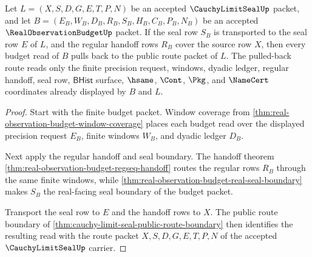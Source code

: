 \begin{theorem}
\label{thm:cauchy-limit-seal-observation-budget-pullback}
Let $L=(X,S,D,G,E,T,P,N)$ be an accepted $\CauchyLimitSealUp$ packet, and let $B=(E_B,W_B,D_B,R_B,S_B,H_B,C_B,P_B,N_B)$ be an accepted $\RealObservationBudgetUp$ packet. If the seal row $S_B$ is transported to the seal row $E$ of $L$, and the regular handoff rows $R_B$ cover the source row $X$, then every budget read of $B$ pulls back to the public route packet of $L$. The pulled-back route reads only the finite precision request, windows, dyadic ledger, regular handoff, seal row, $\mathsf{BHist}$ surface, $\hsame$, $\Cont$, $\Pkg$, and $\NameCert$ coordinates already displayed by $B$ and $L$.
\end{theorem}
\begin{proof}
Start with the finite budget packet. Window coverage from \autoref{thm:real-observation-budget-window-coverage} places each budget read over the displayed precision request $E_B$, finite windows $W_B$, and dyadic ledger $D_B$.

Next apply the regular handoff and seal boundary. The handoff theorem \autoref{thm:real-observation-budget-regseq-handoff} routes the regular rows $R_B$ through the same finite windows, while \autoref{thm:real-observation-budget-real-seal-boundary} makes $S_B$ the real-facing seal boundary of the budget packet.

Transport the seal row to $E$ and the handoff rows to $X$. The public route boundary of \autoref{thm:cauchy-limit-seal-public-route-boundary} then identifies the resulting read with the route packet $X,S,D,G,E,T,P,N$ of the accepted $\CauchyLimitSealUp$ carrier.
\end{proof}

